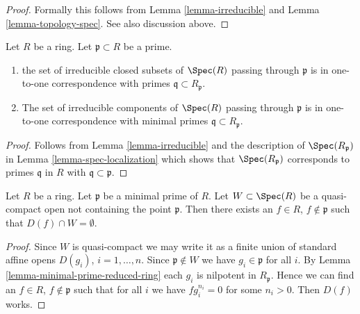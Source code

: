 \begin{proof}
Formally this follows from Lemma \ref{lemma-irreducible} and
Lemma \ref{lemma-topology-spec}. See also discussion above.
\end{proof}

\begin{lemma}
\label{lemma-irreducible-components-containing-x}
Let $R$ be a ring. Let $\mathfrak p \subset R$ be a prime.
\begin{enumerate}
\item the set of irreducible closed subsets of $\Spec(R)$
passing through $\mathfrak p$ is in one-to-one correspondence with
primes $\mathfrak q \subset R_{\mathfrak p}$.
\item The set of irreducible components of $\Spec(R)$ passing through
$\mathfrak p$ is in one-to-one correspondence with minimal
primes $\mathfrak q \subset R_{\mathfrak p}$.
\end{enumerate}
\end{lemma}

\begin{proof}
Follows from Lemma \ref{lemma-irreducible}
and the description of $\Spec(R_\mathfrak p)$ in
Lemma \ref{lemma-spec-localization} which shows that
$\Spec(R_\mathfrak p)$ corresponds to primes $\mathfrak q$ in $R$
with $\mathfrak q \subset \mathfrak p$.
\end{proof}

\begin{lemma}
\label{lemma-standard-open-containing-maximal-point}
Let $R$ be a ring.
Let $\mathfrak p$ be a minimal prime of $R$.
Let $W \subset \Spec(R)$ be a quasi-compact open
not containing the point $\mathfrak p$. Then there
exists an $f \in R$, $f \not \in \mathfrak p$ such
that $D(f) \cap W = \emptyset$.
\end{lemma}

\begin{proof}
Since $W$ is quasi-compact we may write it as a finite union
of standard affine opens $D(g_i)$, $i = 1, \ldots, n$.
Since $\mathfrak p \not \in W$ we have $g_i \in \mathfrak p$ for
all $i$. By Lemma \ref{lemma-minimal-prime-reduced-ring}
each $g_i$ is nilpotent in $R_{\mathfrak p}$. Hence we can find
an $f \in R$, $f \not \in \mathfrak p$ such that for all $i$ we have
$f g_i^{n_i} = 0$ for some $n_i > 0$. Then $D(f)$ works.
\end{proof}

